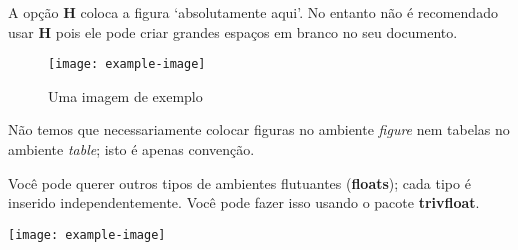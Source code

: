 \documentclass[brazilian]{article}
\begin{document}
A opção \textbf{H} coloca a figura ‘absolutamente aqui’. No entanto não é recomendado usar \textbf{H} pois ele pode criar grandes espaços em branco no seu documento.

\begin{figure}[H]
  \centering
  \texttt{[image: example-image]}
  \caption{Uma imagem de exemplo}
\end{figure}

Não temos que necessariamente colocar figuras no ambiente \textit{figure} nem tabelas no ambiente \textit{table}; isto é apenas convenção.

Você pode querer outros tipos de ambientes flutuantes (\textbf{floats}); cada tipo é inserido independentemente. Você pode fazer isso usando o pacote \textbf{trivfloat}.
\begin{image}
  \centering
  \texttt{[image: example-image]}
  \caption{Uma imagem de exemplo}
\end{image}
\end{document}
